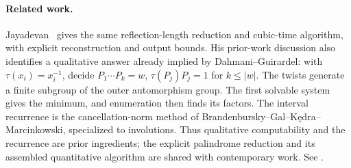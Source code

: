 
\paragraph{Related work.}
Jayadevan~\cite{jayadevan-16-9} gives the same reflection-length
reduction and cubic-time algorithm, with explicit reconstruction and
output bounds. His prior-work discussion also identifies a qualitative
answer already implied by Dahmani--Guirardel\cite[Theorem~4]{dahmani-guirardel-equations}:
with \(\tau(x_i)=x_i^{-1}\), decide
\(P_1\cdots P_k=w\), \(\tau(P_j)P_j=1\) for \(k\le |w|\).
The twists generate a finite subgroup of the outer automorphism group.
The first solvable system gives the minimum, and enumeration then finds
its factors. The interval recurrence is the cancellation-norm method
of Brandenbursky--Gal--K\k{e}dra--Marcinkowski\cite[Section~2.I and the
2023 erratum]{cancellation-norm}, specialized to involutions.
Thus qualitative computability and the recurrence are prior ingredients;
the explicit palindrome reduction and its assembled quantitative algorithm
are shared with contemporary work. See \comparisonlocation{}.
